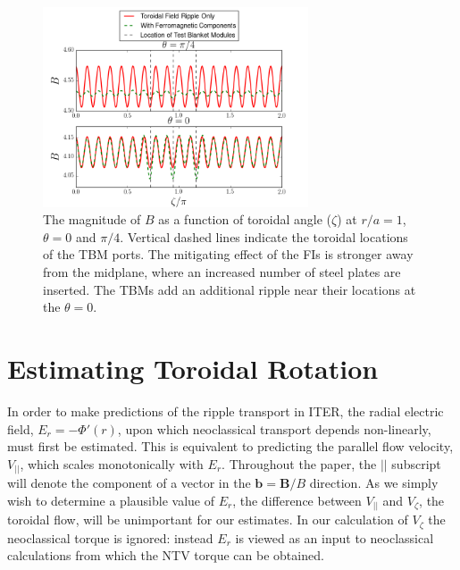 \documentclass{article}
\numberwithin{figure}{section}
\numberwithin{equation}{section}
\begin{document}
\begin{figure}[h!]
\centering
\includegraphics[width=0.7\textwidth]{toroidalripple.png}
\caption{\label{fig:toroidalripple} The magnitude of $B$ as a function of toroidal angle ($\zeta$) at $r/a = 1$, $\theta = 0$ and $\pi/4$. Vertical dashed lines indicate the toroidal locations of the TBM ports. The mitigating effect of the FIs is stronger away from the midplane, where an increased number of steel plates are inserted. The TBMs add an additional ripple near their locations at the $\theta = 0$. }
\end{figure}

\FloatBarrier

\section{Estimating Toroidal Rotation}\label{rotation}

In order to make predictions of the ripple transport in ITER, the radial electric field, $E_r = - \Phi'(r) $, upon which neoclassical transport depends non-linearly, must first be estimated. This is equivalent to predicting the parallel flow velocity, $V_{||}$, which scales monotonically with $E_r$. Throughout the paper, the $||$ subscript will denote the component of a vector in the $\bm{b} = \bm{B}/B$ direction. As we simply wish to determine a plausible value of $E_r$, the difference between $V_{||}$ and $V_{\zeta}$, the toroidal flow, will be unimportant for our estimates. In our calculation of $V_{\zeta}$ the neoclassical torque is ignored: instead $E_r$ is viewed as an input to neoclassical calculations from which the NTV torque can be obtained. 
\end{document}
